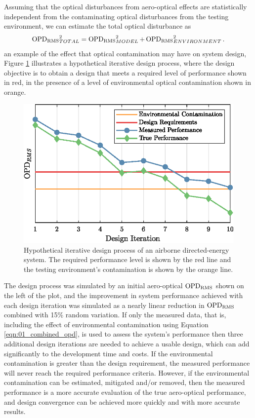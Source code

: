 Assuming that the optical disturbances from aero-optical effects are statistically independent from the contaminating optical disturbances from the testing environment, we can estimate the total optical disturbance as
\begin{equation}
  \operatorname{OPD_{RMS}}_{TOTAL}^2 = \operatorname{OPD_{RMS}}_{MODEL}^2+\operatorname{OPD_{RMS}}_{ENVIRONMENT}^2 \textrm{.}
  \label{eqn:01_combined_opd}
\end{equation}
 an example of the effect that optical contamination may have on system design, Figure \ref{fig:01_design_iteration} illustrates a hypothetical iterative design process, where the design objective is to obtain a design that meets a required level of performance shown in red, in the presence of a level of environmental optical contamination shown in orange.
\begin{figure}
  \centering
  \includegraphics{../matlab/01_introduction/design_iteration.eps}
  \caption{Hypothetical iterative design process of an airborne directed-energy system.  The required performance level is shown by the red line and the testing environment's contamination is shown by the orange line.}
  \label{fig:01_design_iteration}
\end{figure}
The design process was simulated by an initial aero-optical $\operatorname{OPD_{RMS}}$ shown on the left of the plot, and the improvement in system performance achieved with each design iteration was simulated as a nearly linear reduction in $\operatorname{OPD_{RMS}}$ combined with 15\% random variation.
If only the measured data, that is, including the effect of environmental contamination using Equation \ref{eqn:01_combined_opd}, is used to assess the system's performance then three additional design iterations are needed to achieve a usable design, which can add significantly to the development time and costs.
If the environmental contamination is greater than the design requirement, the measured performance will never reach the required performance criteria.
However, if the environmental contamination can be estimated, mitigated and/or removed, then the measured performance is a more accurate evaluation of the true aero-optical performance, and design convergence can be achieved more quickly and with more accurate results.

